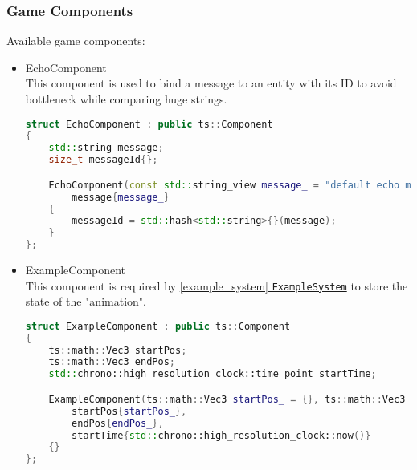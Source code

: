 \subsubsection{Game Components}
Available game components:
\label{sec:game_components}
\begin{itemize}
    \item EchoComponent\\
    \label{echo_component}
    This component is used to bind a message to an entity with its ID to avoid bottleneck while comparing huge strings.
\begin{lstlisting}[language=c++, caption=\texttt{EchoComponent} (./game/components/echo\_component.hpp)]
struct EchoComponent : public ts::Component
{
    std::string message;
    size_t messageId{};

    EchoComponent(const std::string_view message_ = "default echo message") :
        message{message_}
    {
        messageId = std::hash<std::string>{}(message);
    }
};
\end{lstlisting}
    \item ExampleComponent\\
    \label{example_component}
    This component is required by \hyperref[example_system]{\ref*{example_system} \texttt{ExampleSystem}} to store the state of the "animation".
\begin{lstlisting}[language=c++, caption=\texttt{ExampleComponent} class (./game/components/example\_component.hpp)]
struct ExampleComponent : public ts::Component
{
    ts::math::Vec3 startPos;
    ts::math::Vec3 endPos;
    std::chrono::high_resolution_clock::time_point startTime;

    ExampleComponent(ts::math::Vec3 startPos_ = {}, ts::math::Vec3 endPos_ = {}) :
        startPos{startPos_},
        endPos{endPos_},
        startTime{std::chrono::high_resolution_clock::now()}
    {}
};
\end{lstlisting}
\end{itemize}

